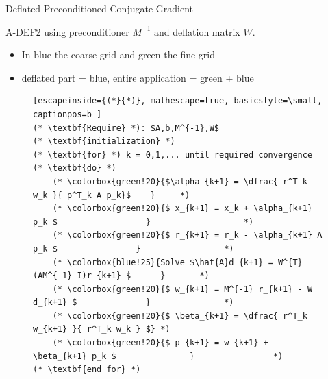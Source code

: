 \documentclass[10pt]{beamer}
\begin{document}
\begin{frame}[fragile]{Deflated Preconditioned Conjugate Gradient}
  \vspace{-2mm}
\begin{block}{A-DEF2 using preconditioner $M^{-1}$ and deflation matrix $W$.}
    \begin{itemize}
        \item In blue the \colorbox{blue!25}{coarse grid} and green the \colorbox{green!20}{fine grid}
        \item \alert{deflated part} = \colorbox{blue!25}{blue}, \alert{entire application} = \colorbox{green!20}{green} + \colorbox{blue!25}{blue}
    \end{itemize}
\end{block}
\vspace{-5mm}
\begin{figure}
  \begin{lstlisting}[escapeinside={(*}{*)}, mathescape=true, basicstyle=\small, captionpos=b ]
(* \textbf{Require} *): $A,b,M^{-1},W$
(* \textbf{initialization} *)
(* \textbf{for} *) k = 0,1,... until required convergence (* \textbf{do} *)
    (* \colorbox{green!20}{$\alpha_{k+1} = \dfrac{ r^T_k w_k }{ p^T_k A p_k}$    }     *)
    (* \colorbox{green!20}{$ x_{k+1} = x_k + \alpha_{k+1} p_k $                  }                   *)
    (* \colorbox{green!20}{$ r_{k+1} = r_k - \alpha_{k+1} A p_k $                }                 *)
    (* \colorbox{blue!25}{Solve $\hat{A}d_{k+1} = W^{T}(AM^{-1}-I)r_{k+1} $      }       *)
    (* \colorbox{green!20}{$ w_{k+1} = M^{-1} r_{k+1} - W d_{k+1} $              }               *)
    (* \colorbox{green!20}{$ \beta_{k+1} = \dfrac{ r^T_k w_{k+1} }{ r^T_k w_k } $} *)
    (* \colorbox{green!20}{$ p_{k+1} = w_{k+1} + \beta_{k+1} p_k $               }                *)
(* \textbf{end for} *)
\end{lstlisting}
\end{figure}

\end{frame}
\end{document}
